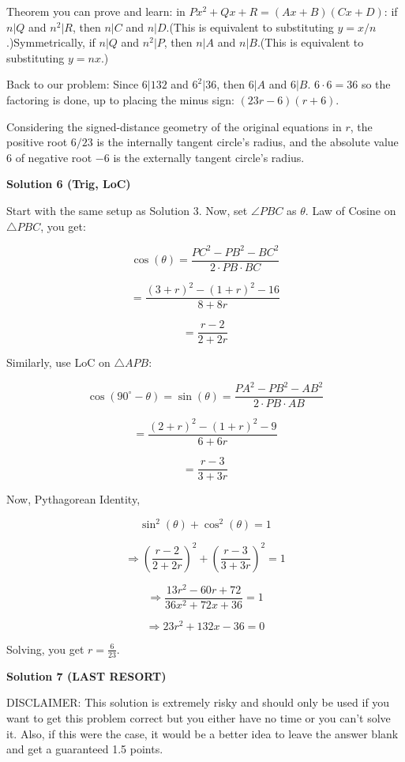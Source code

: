 \begin{enumerate}
 Theorem you can prove and learn: in $Px^2 + Qx + R =  (Ax+B)(Cx+D)$: if $n \vert Q$ and $n^2 \vert R$, then $n\vert C$ and $n \vert D$.(This is equivalent to substituting $y=x/n$.)Symmetrically, if $n \vert Q$ and $n^2 \vert P$, then $n\vert A$ and $n \vert B$.(This is equivalent to substituting $y=nx$.)

 Back to our problem: Since $6 \vert 132$  and $6^2 \vert 36$, then $6 \vert A$ and $6 \vert B$. $6 \cdot 6 =36$ so the factoring is done, up to placing the minus sign: $(23r-6)(r+6)$.

 Considering the signed-distance geometry of the original equations in $r$, the positive root  $\boxed{6/23}$ is the internally tangent circle's radius, and the absolute value $6$ of negative root $-6$ is the externally tangent circle's radius.

 



\textbf{Solution 6 (Trig, LoC)}

Start with the same setup as Solution 3. Now, set $\angle PBC$ as $\theta$. Law of Cosine on $\triangle PBC$, you get:

 
 \[\cos(\theta )=\frac{PC^2-PB^2-BC^2}{2\cdot PB\cdot BC}\]

 \[=\frac{(3+r)^2-(1+r)^2-16}{8+8r}\]

 \[=\frac{r-2}{2+2r}\]

 Similarly, use LoC on $\triangle APB$:

 
 \[\cos(90^\circ -\theta )=\sin(\theta )=\frac{PA^2-PB^2-AB^2}{2\cdot PB\cdot AB}\]

 \[=\frac{(2+r)^2-(1+r)^2-9}{6+6r}\]

 \[=\frac{r-3}{3+3r}\]

 Now, Pythagorean Identity,

 
 \[\sin ^2(\theta)+\cos ^2(\theta)=1\]

 \[\Rightarrow \left( \frac{r-2}{2+2r}\right) ^2+\left( \frac{r-3}{3+3r}\right) ^2=1\]

 \[\Rightarrow \frac{13r^2-60r+72}{36x^2+72x+36}=1\]

 \[\Rightarrow 23r^2+132x-36=0\]

 Solving, you get $r=\boxed{\frac{6}{23}}$.

 



\textbf{Solution 7 (LAST RESORT)}

DISCLAIMER: This solution is extremely risky and should only be used if you want to get this problem correct but you either have no time or you can't solve it. Also, if this were the case, it would be a better idea to leave the answer blank and get a guaranteed 1.5 points.


\end{enumerate}
